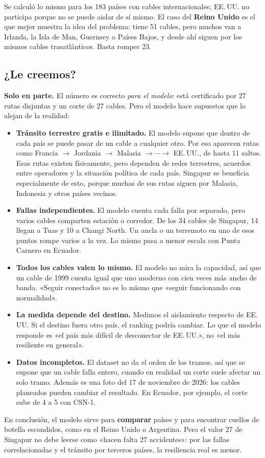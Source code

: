 \documentclass[11pt,a4paper]{article}
\begin{document}
Se calculó lo mismo para los 183 países con cables internacionales; EE.\,UU. no participa porque no se puede aislar de sí mismo. El caso del \textbf{Reino Unido} es el que mejor muestra la idea del problema: tiene 51 cables, pero muchos van a Irlanda, la Isla de Man, Guernsey o Países Bajos, y desde ahí siguen por los mismos cables trasatlánticos. Basta romper 23.

\subsection*{¿Le creemos?}
\textbf{Solo en parte.} El número es correcto \emph{para el modelo}: está certificado por 27 rutas disjuntas y un corte de 27 cables. Pero el modelo hace supuestos que lo alejan de la realidad:
\begin{itemize}
  \item \textbf{Tránsito terrestre gratis e ilimitado.} El modelo supone que dentro de cada país se puede pasar de un cable a cualquier otro. Por eso aparecen rutas como Francia $\to$ Jordania $\to$ Malasia $\to\cdots\to$ EE.\,UU., de hasta 11 saltos. Esas rutas existen físicamente, pero dependen de redes terrestres, acuerdos entre operadores y la situación política de cada país. Singapur se beneficia especialmente de esto, porque muchas de sus rutas siguen por Malasia, Indonesia y otros países vecinos.
  \item \textbf{Fallas independientes.} El modelo cuenta cada falla por separado, pero varios cables comparten estación o corredor. De los 34 cables de Singapur, 14 llegan a Tuas y 10 a Changi North. Un ancla o un terremoto en uno de esos puntos rompe varios a la vez. Lo mismo pasa a menor escala con Punta Carnero en Ecuador.
  \item \textbf{Todos los cables valen lo mismo.} El modelo no mira la capacidad, así que un cable de 1999 cuenta igual que uno moderno con cien veces más ancho de banda. «Seguir conectado» no es lo mismo que «seguir funcionando con normalidad».
  \item \textbf{La medida depende del destino.} Medimos el aislamiento respecto de EE.\,UU. Si el destino fuera otro país, el ranking podría cambiar. Lo que el modelo responde es «el país más difícil de desconectar de EE.\,UU.», no «el más resiliente en general».
  \item \textbf{Datos incompletos.} El dataset no da el orden de los tramos, así que se supone que un cable falla entero, cuando en realidad un corte suele afectar un solo tramo. Además es una foto del 17 de noviembre de 2026: los cables planeados pueden cambiar el resultado. En Ecuador, por ejemplo, el corte sube de 4 a 5 con CSN-1.
\end{itemize}
En conclusión, el modelo sirve para \textbf{comparar} países y para encontrar cuellos de botella escondidos, como en el Reino Unido o Argentina. Pero el valor 27 de Singapur no debe leerse como «hacen falta 27 accidentes»: por las fallas correlacionadas y el tránsito por terceros países, la resiliencia real es menor.
\end{document}
